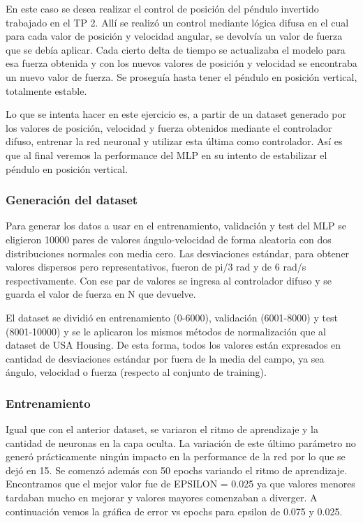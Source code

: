 \documentclass[
]{article}
\begin{document}
En este caso se desea realizar el control de posición del péndulo
invertido trabajado en el TP 2. Allí se realizó un control mediante
lógica difusa en el cual para cada valor de posición y velocidad
angular, se devolvía un valor de fuerza que se debía aplicar. Cada
cierto delta de tiempo se actualizaba el modelo para esa fuerza obtenida
y con los nuevos valores de posición y velocidad se encontraba un nuevo
valor de fuerza. Se proseguía hasta tener el péndulo en posición
vertical, totalmente estable.

Lo que se intenta hacer en este ejercicio es, a partir de un dataset
generado por los valores de posición, velocidad y fuerza obtenidos
mediante el controlador difuso, entrenar la red neuronal y utilizar esta
última como controlador. Así es que al final veremos la performance del
MLP en su intento de estabilizar el péndulo en posición vertical.

\hypertarget{generaciuxf3n-del-dataset}{%
\subsubsection{Generación del dataset}\label{generaciuxf3n-del-dataset}}

Para generar los datos a usar en el entrenamiento, validación y test del
MLP se eligieron 10000 pares de valores ángulo-velocidad de forma
aleatoria con dos distribuciones normales con media cero. Las
desviaciones estándar, para obtener valores dispersos pero
representativos, fueron de pi/3 rad y de 6 rad/s respectivamente. Con
ese par de valores se ingresa al controlador difuso y se guarda el valor
de fuerza en N que devuelve.

El dataset se dividió en entrenamiento (0-6000), validación (6001-8000)
y test (8001-10000) y se le aplicaron los mismos métodos de
normalización que al dataset de USA Housing. De esta forma, todos los
valores están expresados en cantidad de desviaciones estándar por fuera
de la media del campo, ya sea ángulo, velocidad o fuerza (respecto al
conjunto de training).

\hypertarget{entrenamiento}{%
\subsubsection{Entrenamiento}\label{entrenamiento}}

Igual que con el anterior dataset, se variaron el ritmo de aprendizaje y
la cantidad de neuronas en la capa oculta. La variación de este último
parámetro no generó prácticamente ningún impacto en la performance de la
red por lo que se dejó en 15. Se comenzó además con 50 epochs variando
el ritmo de aprendizaje. Encontramos que el mejor valor fue de EPSILON =
0.025 ya que valores menores tardaban mucho en mejorar y valores mayores
comenzaban a diverger. A continuación vemos la gráfica de error vs
epochs para epsilon de 0.075 y 0.025.
\end{document}
